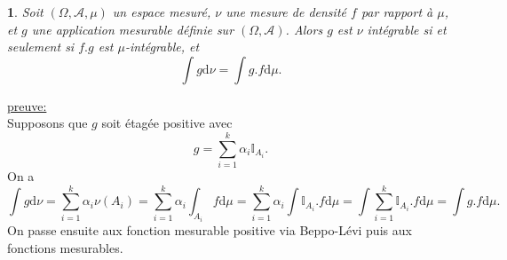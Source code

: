 \documentclass[8pt,notheorems]{beamer}
\newtheorem{theorem}{\translate{Theorem}}[section]
\newtheorem{theorem}{\translate{Theoreme}}
\theoremstyle{definition}
\theoremstyle{example}
\theoremstyle{mystyle}
\theoremstyle{plain}
\begin{document}
\begin{frame}[allowframebreaks]
\begin{theorem}
Soit $(\Omega,\mathcal{A},\mu)$ un espace mesuré, $\nu$ une mesure de densité $f$ par rapport à $\mu$, et $g$ une application mesurable définie sur $(\Omega,\mathcal{A})$. Alors $g$ est $\nu$ intégrable si et seulement si $f.g$ est $\mu$-intégrable, et 
$$
\int g\text{d}\nu = \int g.f\text{d}\mu.
$$
\end{theorem}
\underline{preuve:}\\
Supposons que $g$ soit étagée positive avec 
$$
g = \sum_{i =1}^k\alpha_i\mathbb{I}_{A_i}.
$$
On a 
$$
\int g\text{d}\nu =\sum_{i = 1}^{k}\alpha_i\nu(A_i)=\sum_{i = 1}^{k}\alpha_i\int_{A_i}f\text{d}\mu =  \sum_{i = 1}^{k}\alpha_i \int\mathbb{I}_{A_i}.f\text{d}\mu = \int \sum_{i = 1}^{k}\mathbb{I}_{A_i}.f\text{d}\mu = \int g.f\text{d}\mu.
$$
On passe ensuite aux fonction mesurable positive via Beppo-Lévi puis aux fonctions mesurables. 
\end{frame}
\end{document}
